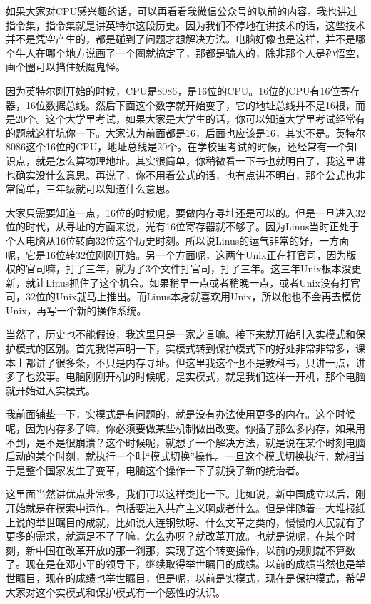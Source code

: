 \documentclass[
  letterpaper,
  DIV=11,
  numbers=noendperiod]{scrreprt}
\begin{document}
如果大家对CPU感兴趣的话，可以再看看我微信公众号的以前的内容。我也讲过指令集，指令集就是讲英特尔这段历史。因为我们不停地在讲技术的话，这些技术并不是凭空产生的，都是碰到了问题才想解决方法。电脑好像也是这样，并不是哪个牛人在哪个地方说画了一个圈就搞定了，那都是骗人的，除非那个人是孙悟空，画个圈可以挡住妖魔鬼怪。

因为英特尔刚开始的时候，CPU是8086，是16位的CPU。16位的CPU有16位寄存器，16位数据总线。然后下面这个数字就开始变了，它的地址总线并不是16根，而是20个。这个大学里考试，如果大家是大学生的话，你可以知道大学里考试经常有的题就这样坑你一下。大家认为前面都是16，后面也应该是16，其实不是。英特尔8086这个16位的CPU，地址总线是20个。在学校里考试的时候，还经常有一个知识点，就是怎么算物理地址。其实很简单，你稍微看一下书也就明白了，我这里讲也确实没什么意思。再说了，你不用看公式的话，也有点讲不明白，那个公式也非常简单，三年级就可以知道什么意思。

大家只需要知道一点，16位的时候呢，要做内存寻址还是可以的。但是一旦进入32位的时代，从寻址的方面来说，光有16位寄存器就不够了。因为Linus当时正处于个人电脑从16位转向32位这个历史时刻。所以说Linus的运气非常的好，一方面呢，它是16位转32位刚刚开始。另一个方面呢，这两年Unix正在打官司，因为版权的官司嘛，打了三年，就为了3个文件打官司，打了三年。这三年Unix根本没更新，就让Linus抓住了这个机会。如果稍早一点或者稍晚一点，或者Unix没有打官司，32位的Unix就马上推出。而Linus本身就喜欢用Unix，所以他也不会再去模仿Unix，再写一个新的操作系统。

当然了，历史也不能假设，我这里只是一家之言嘛。接下来就开始引入实模式和保护模式的区别。首先我得声明一下，实模式转到保护模式下的好处非常非常多，课本上都讲了很多条，不只是内存寻址。但这里我这个也不是教科书，只讲一点，讲多了也没事。电脑刚刚开机的时候呢，是实模式，就是我们这样一开机，那个电脑就开始进入实模式。

我前面铺垫一下，实模式是有问题的，就是没有办法使用更多的内存。这个时候呢，因为内存多了嘛，你必须要做某些机制做出改变。你插了那么多内存，如果用不到，是不是很崩溃？这个时候呢，就想了一个解决方法，就是说在某个时刻电脑启动的某个时刻，就执行一个叫``模式切换''操作。一旦这个模式切换执行，就相当于是整个国家发生了变革，电脑这个操作一下子就换了新的统治者。

这里面当然讲优点非常多，我们可以这样类比一下。比如说，新中国成立以后，刚开始就是在摸索中运作，包括要进入共产主义啊或者什么。但是伴随着一大堆报纸上说的举世瞩目的成就，比如说大连钢铁呀、什么文革之类的，慢慢的人民就有了更多的需求，就满足不了了嘛，怎么办呀？就改革开放。也就是说呢，在某个时刻，新中国在改革开放的那一刹那，实现了这个转变操作，以前的规则就不算数了。现在是在邓小平的领导下，继续取得举世瞩目的成绩。以前的成绩当然也是举世瞩目，现在的成绩也举世瞩目，但是呢，以前是实模式，现在是保护模式，希望大家对这个实模式和保护模式有一个感性的认识。
\end{document}
